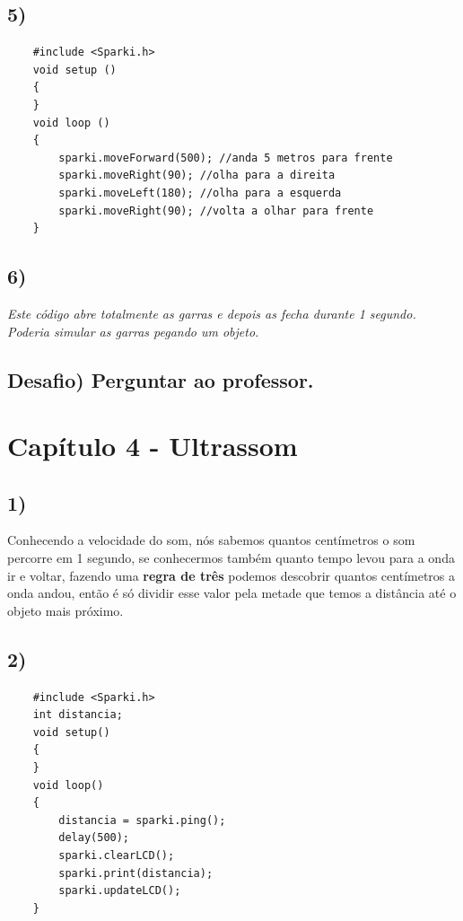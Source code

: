     \subsection*{5)}
    
    \begin{verbatim}
    #include <Sparki.h>
    void setup ()
    {
    }
    void loop ()
    {
        sparki.moveForward(500); //anda 5 metros para frente
        sparki.moveRight(90); //olha para a direita
        sparki.moveLeft(180); //olha para a esquerda
        sparki.moveRight(90); //volta a olhar para frente
    }
    \end{verbatim}

    \subsection*{6)}
    \textsl{Este código abre totalmente as garras e depois as fecha durante 1 segundo. Poderia simular as garras pegando um objeto.}
    
    \subsection*{Desafio) Perguntar ao professor.}
    
\section*{Capítulo 4 - Ultrassom}

    \subsection*{1)}
    
        Conhecendo a velocidade do som, nós sabemos quantos centímetros o som percorre em 1 segundo, se conhecermos também quanto tempo levou para a onda ir e voltar, fazendo uma \textbf{regra de três} podemos descobrir quantos centímetros a onda andou, então é só dividir esse valor pela metade que temos a distância até o objeto mais próximo.
    
    \subsection*{2)}
    
    \begin{verbatim}
    #include <Sparki.h>
    int distancia;
    void setup()
    {
    }
    void loop()
    {
        distancia = sparki.ping();
        delay(500);
        sparki.clearLCD();
        sparki.print(distancia);
        sparki.updateLCD();
    }
    \end{verbatim}
    
